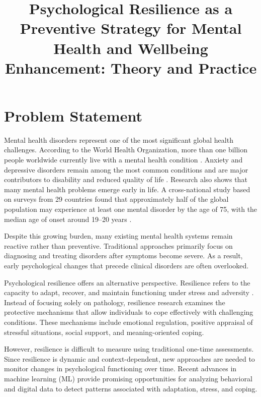 \documentclass[conference]{IEEEtran}
\begin{document}
\title{Psychological Resilience as a Preventive Strategy for Mental Health and Wellbeing Enhancement: Theory and Practice}

\author{
}

\maketitle
\IEEEpeerreviewmaketitle

\section{Problem Statement}

Mental health disorders represent one of the most significant global health challenges. According to the World Health Organization, more than one billion people worldwide currently live with a mental health condition \cite{WHO2025}. Anxiety and depressive disorders remain among the most common conditions and are major contributors to disability and reduced quality of life \cite{WHO2024}. Research also shows that many mental health problems emerge early in life. A cross-national study based on surveys from 29 countries found that approximately half of the global population may experience at least one mental disorder by the age of 75, with the median age of onset around 19–20 years \cite{McGrath2023}.

Despite this growing burden, many existing mental health systems remain reactive rather than preventive. Traditional approaches primarily focus on diagnosing and treating disorders after symptoms become severe. As a result, early psychological changes that precede clinical disorders are often overlooked.

Psychological resilience offers an alternative perspective. Resilience refers to the capacity to adapt, recover, and maintain functioning under stress and adversity \cite{Azam2024}. Instead of focusing solely on pathology, resilience research examines the protective mechanisms that allow individuals to cope effectively with challenging conditions. These mechanisms include emotional regulation, positive appraisal of stressful situations, social support, and meaning-oriented coping.

However, resilience is difficult to measure using traditional one-time assessments. Since resilience is dynamic and context-dependent, new approaches are needed to monitor changes in psychological functioning over time. Recent advances in machine learning (ML) provide promising opportunities for analyzing behavioral and digital data to detect patterns associated with adaptation, stress, and coping.
\end{document}
